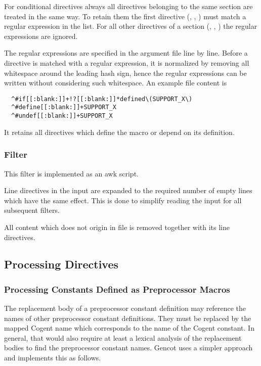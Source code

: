 For conditional directives always all directives belonging to the same section are treated in the same way.
To retain them the first directive (, , ) must match a regular expression
in the list. For all other directives of a section (, , ) the 
regular expressions are ignored.

The regular expressions are specified in the argument file line by line. Before a directive is matched with 
a regular expression, it is normalized by removing all whitespace around the leading hash sign, hence the
regular expressions can be written without considering such whitespace. An example file content is
\begin{verbatim}
  ^#if[[:blank:]]+!?[[:blank:]]*defined\(SUPPORT_X\)
  ^#define[[:blank:]]+SUPPORT_X
  ^#undef[[:blank:]]+SUPPORT_X
\end{verbatim}
It retains all directives which define the macro  or depend on its definition.

\subsubsection{Filter }

This filter is implemented as an awk script.

Line directives in the input are expanded to the required number of empty lines
which have the same effect. This is done to simplify reading the input for all subsequent filters.

All content which does not origin in file  is removed together with its line directives.

\subsection{Processing Directives}

\subsubsection{Processing Constants Defined as Preprocessor Macros}

The replacement body of a preprocessor constant definition may reference the names of other preprocessor
constant definitions. They must be replaced by the mapped Cogent name which corresponds to the name of
the Cogent constant. In general, that would also require at least a lexical analysis of the replacement
bodies to find the preprocessor constant names. Gencot uses a simpler approach and implements this as follows.

